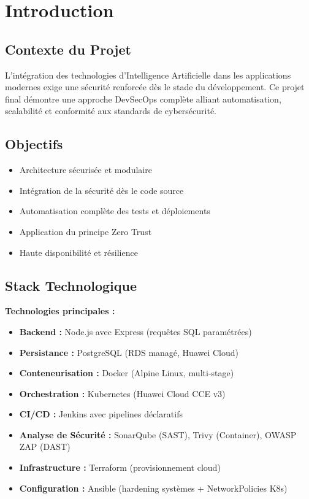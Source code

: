 \documentclass[12pt,a4paper]{article}
\begin{document}
\section{Introduction}

\subsection{Contexte du Projet}

L'intégration des technologies d'Intelligence Artificielle dans les applications modernes exige une sécurité renforcée dès le stade du développement. Ce projet final démontre une approche DevSecOps complète alliant automatisation, scalabilité et conformité aux standards de cybersécurité.

\subsection{Objectifs}
\begin{itemize}
    \item Architecture sécurisée et modulaire
    \item Intégration de la sécurité dès le code source
    \item Automatisation complète des tests et déploiements
    \item Application du principe Zero Trust
    \item Haute disponibilité et résilience
\end{itemize}

\subsection{Stack Technologique}
\begin{importantbox}
\textbf{Technologies principales :}
\begin{itemize}
    \item \textbf{Backend :} Node.js avec Express (requêtes SQL paramétrées)
    \item \textbf{Persistance :} PostgreSQL (RDS managé, Huawei Cloud)
    \item \textbf{Conteneurisation :} Docker (Alpine Linux, multi-stage)
    \item \textbf{Orchestration :} Kubernetes (Huawei Cloud CCE v3)
    \item \textbf{CI/CD :} Jenkins avec pipelines déclaratifs
    \item \textbf{Analyse de Sécurité :} SonarQube (SAST), Trivy (Container), OWASP ZAP (DAST)
    \item \textbf{Infrastructure :} Terraform (provisionnement cloud)
    \item \textbf{Configuration :} Ansible (hardening systèmes + NetworkPolicies K8s)
\end{itemize}
\end{importantbox}
\end{document}
